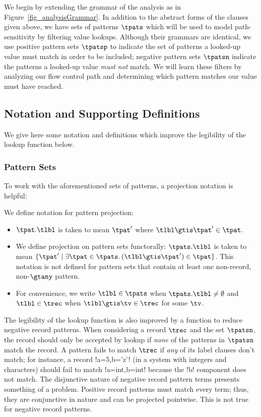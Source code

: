 \documentclass[nocopyright]{sigplanconf}
\begin{document}
We begin by extending the grammar of the analysis as in Figure~\ref{fig_analysisGrammar}.  In addition to the abstract forms of the clauses given above, we have sets of patterns $\tpats$ which will be used to model path-sensitivity by filtering value lookups.  Although their grammars are identical, we use positive pattern sets $\tpatsp$ to indicate the set of patterns a looked-up value must match in order to be included; negative pattern sets $\tpatsn$ indicate the patterns a looked-up value \emph{must not} match.  We will learn these filters by analyzing our flow control path and determining which pattern matches our value must have reached.

\subsection{Notation and Supporting Definitions}

We give here some notation and definitions which improve the legibility of the lookup function below.

\subsubsection{Pattern Sets}

To work with the aforementioned sets of patterns, a projection notation is helpful:

\begin{notation}
    We define notation for pattern projection:
    \begin{itemize}
        \item $\tpat.\tlbl$ is taken to mean $\tpat'$ where $\tlbl \gtis \tpat' \in \tpat$.
        \item We define projection on pattern sets functorally: $\tpats.\tlbl$ is taken to mean $\{\tpat' \mid \exists \tpat \in \tpats.\, (\tlbl \gtis \tpat') \in \tpat\}$.  This notation is not defined for pattern sets that contain at least one non-record, non-$\gtany$ pattern.
        \item For convenience, we write $\tlbl \in \tpats$ when $\tpats.\tlbl \neq \emptyset$ and $\tlbl \in \trec$ when $\tlbl \gtis \tv \in \trec$ for some $\tv$.
    \end{itemize}
\end{notation}

The legibility of the lookup function is also improved by a function to reduce negative record patterns.  When considering a record $\trec$ and the set $\tpatsn$, the record should only be accepted by lookup if \emph{none} of the patterns in $\tpatsn$ match the record.  A pattern fails to match $\trec$ if \emph{any} of its label clauses don't match; for instance, a record \plangil!{a=5,b='z'}! (in a system with integers and characters) should fail to match \plangil!{a=int,b=int}! because the \plangil!b! component does not match.  The disjunctive nature of negative record pattern terms presents something of a problem.  Positive record patterns must match every term; thus, they are conjunctive in nature and can be projected pointwise.  This is not true for negative record patterns.
\end{document}
